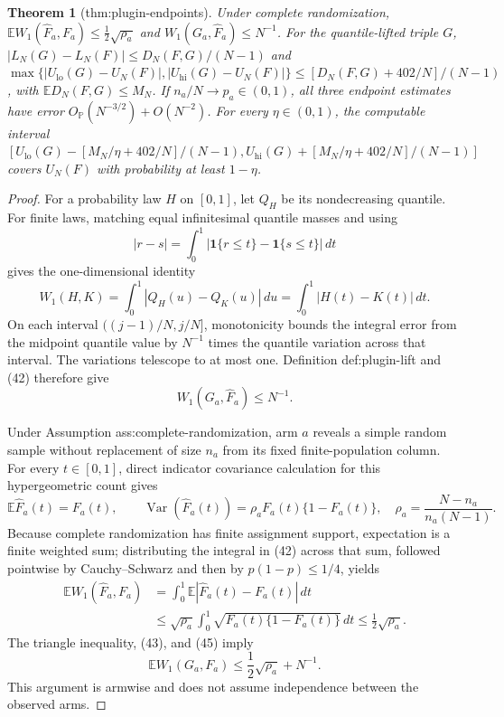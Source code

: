 \documentclass{article}
\newtheorem{theorem}{Theorem}
\begin{document}
\begin{theorem}[thm:plugin-endpoints]\label{thm:plugin-endpoints}
Under complete randomization, \(\mathbb E W_1(\widehat F_a,F_a)\le\tfrac12\sqrt{\rho_a}\) and \(W_1(G_a,\widehat F_a)\le N^{-1}\).  For the quantile-lifted triple \(G\), \(|L_N(G)-L_N(F)|\le D_N(F,G)/(N-1)\) and \(\max\{|U_{\mathrm{lo}}(G)-U_N(F)|,|U_{\mathrm{hi}}(G)-U_N(F)|\}\le[D_N(F,G)+402/N]/(N-1)\), with \(\mathbb ED_N(F,G)\le M_N\).  If \(n_a/N\to p_a\in(0,1)\), all three endpoint estimates have error \(O_{\mathbb P}(N^{-3/2})+O(N^{-2})\).  For every \(\eta\in(0,1)\), the computable interval \([U_{\mathrm{lo}}(G)-[M_N/\eta+402/N]/(N-1),U_{\mathrm{hi}}(G)+[M_N/\eta+402/N]/(N-1)]\) covers \(U_N(F)\) with probability at least \(1-\eta\).
\end{theorem}
\begin{proof}
For a probability law \(H\) on \([0,1]\), let \(Q_H\) be its nondecreasing quantile.  For finite laws, matching equal infinitesimal quantile masses and using
\[
 |r-s|=\int_0^1|\mathbf1\{r\le t\}-\mathbf1\{s\le t\}|\,dt
\]
gives the one-dimensional identity
\[
 W_1(H,K)=\int_0^1|Q_H(u)-Q_K(u)|\,du
 =\int_0^1|H(t)-K(t)|\,dt. \tag{42}
\]
On each interval \(((j-1)/N,j/N]\), monotonicity bounds the integral error from the midpoint quantile value by \(N^{-1}\) times the quantile variation across that interval.  The variations telescope to at most one.  Definition def:plugin-lift and (42) therefore give
\[
 W_1(G_a,\widehat F_a)\le N^{-1}. \tag{43}
\]

Under Assumption ass:complete-randomization, arm \(a\) reveals a simple random sample without replacement of size \(n_a\) from its fixed finite-population column.  For every \(t\in[0,1]\), direct indicator covariance calculation for this hypergeometric count gives
\[
 \mathbb E\widehat F_a(t)=F_a(t),\qquad
 \operatorname{Var}(\widehat F_a(t))
 =\rho_aF_a(t)\{1-F_a(t)\},\quad
 \rho_a=\frac{N-n_a}{n_a(N-1)}. \tag{44}
\]
Because complete randomization has finite assignment support, expectation is a finite weighted sum; distributing the integral in (42) across that sum, followed pointwise by Cauchy--Schwarz and then by \(p(1-p)\le1/4\), yields
\[
\begin{aligned}
 \mathbb E W_1(\widehat F_a,F_a)
 &=\int_0^1\mathbb E|\widehat F_a(t)-F_a(t)|\,dt\\
 &\le\sqrt{\rho_a}\int_0^1\sqrt{F_a(t)\{1-F_a(t)\}}\,dt
 \le\frac12\sqrt{\rho_a}. \tag{45}
\end{aligned}
\]
The triangle inequality, (43), and (45) imply
\[
 \mathbb EW_1(G_a,F_a)\le\frac12\sqrt{\rho_a}+N^{-1}. \tag{46}
\]
This argument is armwise and does not assume independence between the observed arms.


\end{proof}
\end{document}
